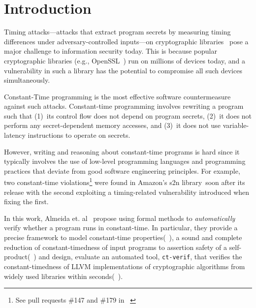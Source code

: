 \section{Introduction}

Timing attacks---attacks that extract program secrets by measuring timing differences under adversary-controlled inputs---on cryptographic libraries~\cite{bernstein_cache_timing_attacks, dsa_exponentiations} pose a major challenge to information security today. 
This is because popular cryptographic libraries (e.g., OpenSSL~\cite{openssl}) run on millions of devices today, and a vulnerability in such a library has the potential to compromise all such devices simultaneously.

Constant-Time programming is the most effective software countermeasure against such attacks.
Constant-time programming involves rewriting a program such that (1)~its control flow does not depend on program secrets, (2)~it does not perform any secret-dependent memory accesses, and (3)~it does not use variable-latency instructions to operate on secrets.

However, writing and reasoning about constant-time programs is hard since it typically involves the use of low-level programming languages and programming practices that deviate from good software engineering principles.
For example, two constant-time violations\footnote{See pull requests \#147 and \#179 in ~\cite{s2n}} were found in Amazon's s2n library~\cite{s2n}soon after its release with the second exploiting a timing-related vulnerability introduced when fixing the first.

In this work, Almeida et. al~\cite{almeida} propose using formal methods to \emph{automatically} verify whether a program runs in constant-time. 
In particular, they provide a precise framework to model constant-time properties(~), a sound and complete reduction of constant-timedness of input programs to assertion safety of a self-product(~) and design, evaluate an automated tool, \texttt{ct-verif}, that verifies the constant-timedness of LLVM implementations of cryptographic algorithms from widely used libraries within seconds(~). 
